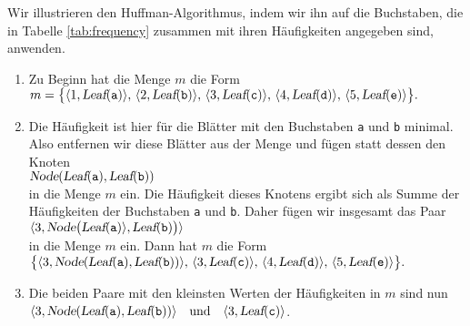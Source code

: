 Wir illustrieren den  Huffman-Algorithmus, indem wir ihn auf die Buchstaben, die in
Tabelle \ref{tab:frequency} zusammen mit ihren H\"aufigkeiten angegeben sind, anwenden.
\begin{enumerate}
\item Zu Beginn hat die Menge $m$ die Form
      \\[0.2cm]
      \hspace*{1.3cm}
      $ m = \bigl\{ \langle 1, \textsl{Leaf}(\mathtt{a}) \rangle,\,
             \langle 2, \textsl{Leaf}(\mathtt{b}) \rangle,\, 
             \langle 3, \textsl{Leaf}(\mathtt{c}) \rangle,\,
             \langle 4, \textsl{Leaf}(\mathtt{d}) \rangle,\,
             \langle 5, \textsl{Leaf}(\mathtt{e}) \rangle\bigr\}. $
\item Die H\"aufigkeit ist hier f\"ur die Bl\"atter mit den Buchstaben \texttt{a} und
      \texttt{b} minimal.  Also entfernen wir diese Bl\"atter aus der Menge und f\"ugen statt
      dessen den Knoten 
      \\[0.2cm]
      \hspace*{1.3cm}
      $\textsl{Node}(\textsl{Leaf}(\mathtt{a}), \textsl{Leaf}(\mathtt{b}))$
      \\[0.2cm]
      in die Menge $m$ ein.  Die H\"aufigkeit dieses Knotens ergibt sich als Summe der H\"aufigkeiten
      der Buchstaben \texttt{a} und \texttt{b}. Daher f\"ugen wir insgesamt das Paar
      \\[0.2cm]
      \hspace*{1.3cm}
      $\langle 3, \textsl{Node}\bigl(\textsl{Leaf}(\mathtt{a}) \rangle, \textsl{Leaf}(\mathtt{b}) \bigr) \rangle$
      \\[0.2cm]
      in die Menge $m$ ein.        Dann hat $m$ die Form
      \\[0.2cm]
      \hspace*{1.3cm}
      $ \bigl\{\langle 3, \textsl{Node}(\textsl{Leaf}(\mathtt{a}), \textsl{Leaf}(\mathtt{b}))\rangle,\,
             \langle 3, \textsl{Leaf}(\mathtt{c}) \rangle,\, \langle 4, \textsl{Leaf}(\mathtt{d}) \rangle,\,
             \langle 5, \textsl{Leaf}(\mathtt{e}) \rangle\bigr\}. $
\item Die beiden Paare mit den kleinsten Werten der H\"aufigkeiten in $m$ sind nun
      \\[0.2cm]
      \hspace*{1.3cm}
      $ \langle 3, \textsl{Node}(\textsl{Leaf}(\mathtt{a}), \textsl{Leaf}(\mathtt{b})) \rangle
         \quad \mathrm{und} \quad \langle 3, \textsl{Leaf}(\mathtt{c})\rangle$.
      \\[0.2cm]

\end{enumerate}
